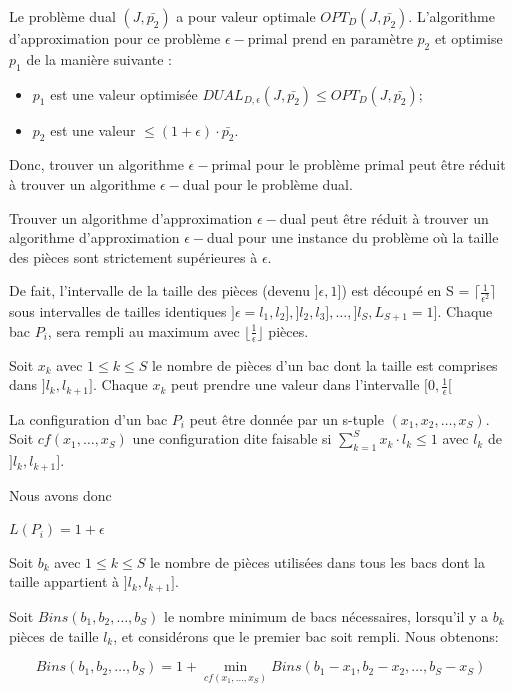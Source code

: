\documentclass[a4paper,12pt]{report}
\theoremstyle{plain}				%
\theoremstyle{definition}				%
\begin{document}
Le problème dual $(J,\bar{p_2})$ a pour valeur optimale $OPT_D(J,\bar{p_2})$.
L'algorithme d'approximation pour ce problème $\epsilon-$primal prend en paramètre $p_2$ 
  et optimise $p_1$ de la manière suivante :

\begin{itemize}
	\item $p_1$ est une valeur optimisée $DUAL_{D,\epsilon}(J, \bar{p_2})\le OPT_D(J,\bar{p_2})$;
	\item $p_2$ est une valeur $ \le (1+\epsilon)\cdot \bar{p_2}$.	 
\end{itemize}

Donc, trouver un algorithme $\epsilon-$primal pour le problème primal
peut être réduit à trouver un algorithme $\epsilon-$dual pour le problème dual.

Trouver un algorithme d'approximation $\epsilon-$dual peut être
réduit à trouver un algorithme
d'approximation $\epsilon-$dual pour une instance du problème où la
taille des pièces sont strictement supérieures à $\epsilon$.

De fait, l'intervalle de la taille des pièces (devenu $]\epsilon, 1]$) est
découpé en S = $\lceil \frac{1}{\epsilon^2}\rceil$ sous intervalles
de tailles identiques
$]\epsilon = l_1, l_2], ]l_2, l_3], \ldots , ]l_S, L_{S+1}=1]$.
Chaque bac $P_i$, sera rempli au maximum avec
$\lfloor \frac{1}{\epsilon} \rfloor$ pièces.

Soit $x_k$ avec $1 \le k \le S$ le nombre de pièces d'un bac dont la
taille est comprises dans $]l_k, l_{k+1}]$.
Chaque $x_k$ peut prendre une valeur dans l'intervalle
$[0,\frac{1}{\epsilon}[$

La configuration d'un bac $P_i$ peut être donnée par un s-tuple $(x_1, x_2, \ldots, x_S)$.
Soit $cf(x_1, \ldots ,x_S)$ une configuration dite faisable si 
$\sum_{k=1}^{S}x_k \cdot l_k \le 1$ 
avec $l_k$ de $]l_k, l_{k+1}]$.


Nous avons donc

$L(P_i) = 1 + \epsilon$

Soit $b_k$ avec $1 \le k \le S$ le nombre de pièces utilisées dans
tous les bacs dont la taille appartient à $]l_k, l_{k+1}]$.

Soit $Bins(b_1, b_2, \ldots, b_S)$ le nombre minimum de bacs
nécessaires, lorsqu'il y a $b_k$ pièces de taille $l_k$, et
considérons que le premier bac soit rempli. Nous obtenons:

\[
  Bins(b_1, b_2, \ldots, b_S) = 1 + \underset{cf(x_1, \ldots ,x_S)}{\min} Bins(b_1-x_1, b_2-x_2, \ldots, b_S-x_S)
\]
\end{document}
